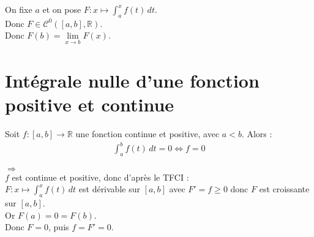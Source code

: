 \documentclass[../main.tex]{subfiles}
\begin{document}
\noindent On fixe $a$ et on pose $F:x\mapsto \int_{a}^{x} f(t) \,dt$. \\
Donc $F\in \mathcal{C}^0([a, b], \mathbb{R})$. \\
Donc $F(b) = \lim\limits_{x\to b} F(x)$. 

\section{Intégrale nulle d'une fonction positive et continue}
\begin{tcolorbox}[title=Propostion 26.69, title filled=false, colframe=lightblue, colback=lightblue!10!white]
    Soit $f:[a, b]\to \mathbb{R}$ une fonction continue et positive, avec $a < b$. Alors : 
    \begin{align*}
        \int_{a}^{b} f(t) \,dt = 0 \Leftrightarrow f = 0
    \end{align*}
\end{tcolorbox}

$\boxed{\Rightarrow}$ \\
$f$ est continue et positive, donc d'après le TFCI : \\
$F:x\mapsto \int_{a}^{x} f(t) \,dt$ est dérivable sur $[a, b]$ avec $F' = f \geq 0$ donc $F$ est croissante sur $[a, b]$. \\
Or $F(a) = 0 = F(b)$. \\
Donc $F = 0$, puis $f = F' = 0$. 
\end{document}
